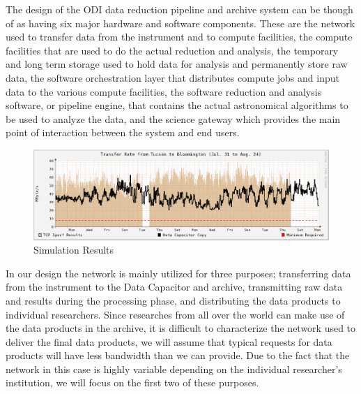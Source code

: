 \documentclass[10pt,conference]{IEEEtran}
\begin{document}
The design of the ODI data reduction pipeline and archive system can be though of as having six major hardware and software components. These are the network used to transfer data from the instrument and to compute facilities, the compute facilities that are used to do the actual reduction and analysis, the temporary and long term storage used to hold data for analysis and permanently store raw data, the software orchestration layer that distributes compute jobs and input data to the various compute facilities, the software reduction and analysis software, or pipeline engine, that contains the actual astronomical algorithms to be used to analyze the data, and the science gateway which provides the main point of interaction between the system and end users.   

\begin{figure}[t]
\centering
\includegraphics[width=6in]{network_throughput.eps}
\caption{Simulation Results}
\label{fig:network}
\end{figure}

In our design the network is mainly utilized for three purposes; transferring data from the instrument to the Data Capacitor and archive, transmitting raw data and results during the processing phase, and distributing the data products to individual researchers. Since researches from all over the world can make use of the data products in the archive, it is difficult to characterize the network used to deliver the final data products, we will assume that typical requests for data products will have less bandwidth than we can provide. Due to the fact that the network in this case is highly variable depending on the individual researcher's institution, we will focus on the first two of these purposes. 
\end{document}
